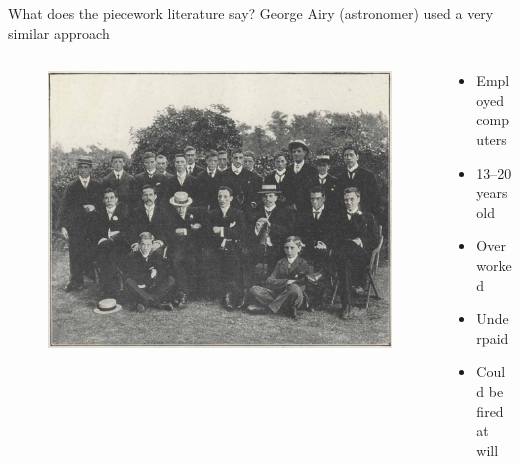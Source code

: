 \documentclass[presentation]{subfiles}
\begin{document}
\begin{frame}{What does the piecework literature say?}
      George Airy (astronomer) used a very similar approach~\cite{grier2013computers}
    \begin{columns}
    \begin{column}{0.6\textwidth}
      \begin{figure}
        \includegraphics[width=\textwidth]{figures/photo/Greenwich-Observatory-computing-staff-1902.jpg}
      \end{figure}
    \end{column}
    
    \begin{column}{0.4\textwidth}
      \begin{itemize}
        \item Employed computers
        \item 13--20 years old
        \item Overworked
        \item Underpaid
        \item Could be fired at will
      \end{itemize}
    \end{column}
    \end{columns}

\end{frame}
\end{document}
